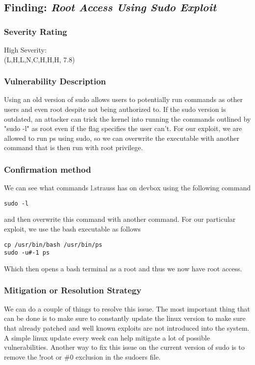 \documentclass[notitlepage]{article}
\begin{document}
  \subsection{Finding: \emph{Root Access Using Sudo Exploit}}

	\subsubsection*{Severity Rating}
        High Severity: \\
		\cvss(L,H,L,N,C,H,H,H, 7.8)
		
  	\subsubsection*{Vulnerability Description}
  	Using an old version of sudo allows users to potentially run commands as other users and even root despite not being authorized to. If the sudo version is outdated,
    an attacker can trick the kernel into running the commands outlined by "sudo -l" as root even if the flag specifies the user can't. For our exploit, we are allowed to run ps
    using sudo, so we can overwrite the executable with another command that is then run with root privilege. 
  	\subsubsection*{Confirmation method}
  	We can see what commands l.strauss has on devbox using the following command
\begin{verbatim}
sudo -l
\end{verbatim}
    and then overwrite this command with another command. For our particular exploit, we use the bash executable as follows
\begin{verbatim}
cp /usr/bin/bash /usr/bin/ps
sudo -u#-1 ps
\end{verbatim}
    Which then opens a bash terminal as a root and thus we now have root access. 

    \subsubsection*{Mitigation or Resolution Strategy}
    We can do a couple of things to resolve this issue. The most important thing that can be done is to make sure to constantly update the linux version to make sure
    that already patched and well known exploits are not introduced into the system. A simple linux update every week can help mitigate a lot of possible vulnerabilities. Another way
    to fix this issue on the current version of sudo is to remove the !root or {\#}0 exclusion in the sudoers file.
\end{document}
